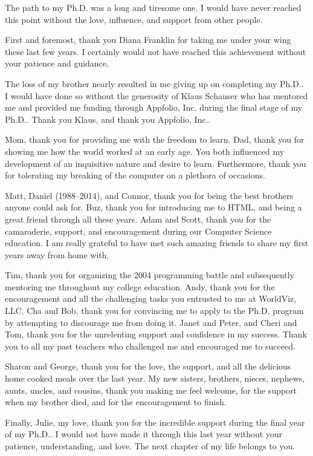 \begin{acknowledgements}

The path to my Ph.D. was a long and tiresome one. I would have never reached
this point without the love, influence, and support from other people.

First and foremost, thank you Diana Franklin for taking me under your wing
these last few years. I certainly would not have reached this achievement
without your patience and guidance.

The loss of my brother nearly resulted in me giving up on completing my
Ph.D.. I would have done so without the generosity of Klaus Schauser who has
mentored me and provided me funding through Appfolio, Inc. during the final
stage of my Ph.D.. Thank you Klaus, and thank you Appfolio, Inc..

Mom, thank you for providing me with the freedom to learn. Dad, thank you for
showing me how the world worked at an early age. You both influenced my
development of an inquisitive nature and desire to learn. Furthermore, thank
you for tolerating my breaking of the computer on a plethora of occasions.

Matt, Daniel (1988--2014), and Connor, thank you for being the best brothers
anyone could ask for. Buz, thank you for introducing me to HTML, and being a
great friend through all these years. Adam and Scott, thank you for the
camaraderie, support, and encouragement during our Computer Science
education. I am really grateful to have met such amazing friends to share my
first years away from home with.

Tim, thank you for organizing the 2004 programming battle and subsequently
mentoring me throughout my college education. Andy, thank you for the
encouragement and all the challenging tasks you entrusted to me at WorldViz,
LLC. Cha and Bob, thank you for convincing me to apply to the Ph.D. program by
attempting to discourage me from doing it. Janet and Peter, and Cheri and Tom,
thank you for the unrelenting support and confidence in my success. Thank you
to all my past teachers who challenged me and encouraged me to succeed.

Sharon and George, thank you for the love, the support, and all the delicious
home cooked meals over the last year. My new sisters, brothers, nieces,
nephews, aunts, uncles, and cousins, thank you making me feel welcome, for the
support when my brother died, and for the encouragement to finish.

Finally, Julie, my love, thank you for the incredible support during the final
year of my Ph.D.. I would not have made it through this last year without your
patience, understanding, and love. The next chapter of my life belongs to you.

\end{acknowledgements}
